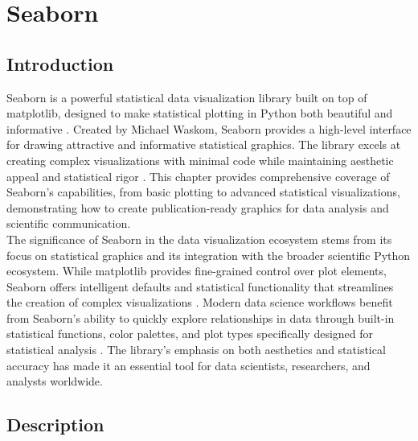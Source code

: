 %
%
%


%
%

\chapter{Seaborn}
\label{ch:seaborn}

\section{Introduction}
\label{sec:intro}

Seaborn is a powerful statistical data visualization library built on top of matplotlib, designed to make statistical plotting in Python both beautiful and informative \cite{Seaborn:2024}. Created by Michael Waskom, Seaborn provides a high-level interface for drawing attractive and informative statistical graphics. The library excels at creating complex visualizations with minimal code while maintaining aesthetic appeal and statistical rigor \cite{Waskom:2021}. This chapter provides comprehensive coverage of Seaborn's capabilities, from basic plotting to advanced statistical visualizations, demonstrating how to create publication-ready graphics for data analysis and scientific communication.\\

The significance of Seaborn in the data visualization ecosystem stems from its focus on statistical graphics and its integration with the broader scientific Python ecosystem. While matplotlib provides fine-grained control over plot elements, Seaborn offers intelligent defaults and statistical functionality that streamlines the creation of complex visualizations \cite{Seaborn:2024}. Modern data science workflows benefit from Seaborn's ability to quickly explore relationships in data through built-in statistical functions, color palettes, and plot types specifically designed for statistical analysis \cite{VanderPlas:2023}. The library's emphasis on both aesthetics and statistical accuracy has made it an essential tool for data scientists, researchers, and analysts worldwide.\\

\section{Description}
\label{sec:description}

